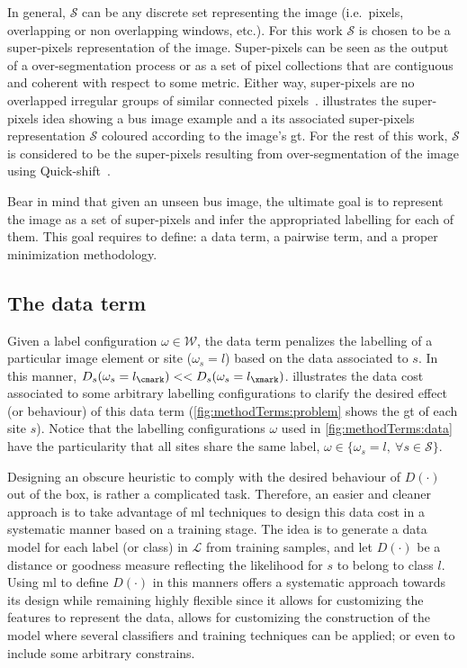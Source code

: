 In general, $\mathcal{S}$ can be any discrete set representing the image (i.e.\, pixels, overlapping or non overlapping windows, etc.). 
For this work $\mathcal{S}$ is chosen to be a super-pixels representation of the image.
Super-pixels can be seen as the output of a over-segmentation process or as a set of pixel collections that are contiguous and coherent with respect to some metric. Either way, super-pixels are no overlapped irregular groups of similar connected pixels~\cite{achanta2012slic}.
 illustrates the super-pixels idea showing a \ac{bus} image example and a its associated super-pixels representation $\mathcal{S}$ coloured according to the image's \ac{gt}.
For the rest of this work, $\mathcal{S}$ is considered to be the super-pixels resulting from over-segmentation of the image using Quick-shift~\cite{massich2013phd}.

Bear in mind that given an unseen \ac{bus} image, the ultimate goal is to represent the image as a set of super-pixels and infer the appropriated labelling for each of them.
This goal requires to define: a data term, a pairwise term, and a proper minimization methodology.

\subsection{The data term} \label{sec:method:dataTerm}

Given a label configuration $\omega \in \mathcal{W}$, the data term penalizes the labelling of a particular image element or site ($\omega_s = l$) based on the data associated to $s$.
In this manner, $D_s(\omega_s=l_\cmark) << D_s(\omega_s=l_\xmark)$.
 illustrates the data cost associated to some arbitrary labelling configurations to clarify the desired effect (or behaviour) of this data term (\cref{fig:methodTerms:problem} shows the \ac{gt} of each site $s$).
Notice that the labelling configurations $\omega$ used in \cref{fig:methodTerms:data} have the particularity that all sites share the same label, $\omega \in \{ \omega_s=l,~\forall s\in\mathcal{S}\}$.

Designing an obscure heuristic to comply with the desired behaviour of $D(\cdot)$ out of the box, is rather a complicated task.
Therefore, an easier and cleaner approach is to take advantage of \ac{ml} techniques to design this data cost in a systematic manner based on a training stage. 
The idea is to generate a data model for each label (or class) in $\mathcal{L}$ from training samples, and let $D(\cdot)$ be a distance or goodness measure reflecting the likelihood for $s$ to belong to class $l$.
Using \ac{ml} to define $D(\cdot)$ in this manners offers a systematic approach towards its design while remaining highly flexible since it allows for customizing the features to represent the data, allows for customizing the construction of the model where several classifiers and training techniques can be applied; or even to include some arbitrary constrains.

